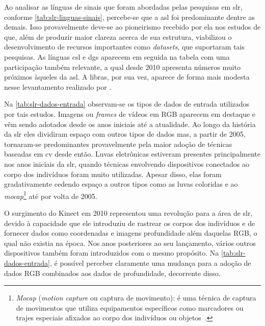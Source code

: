 




Ao analisar as línguas de sinais que foram abordadas pelas pesquisas em \acrshort{slr}, conforme \autoref{tab:slr-linguas-sinais}, percebe-se que a \acrshort{asl} foi predominante dentre as demais. Isso provavelmente deve-se ao pioneirismo recebido por ela nos estudos de  que, além de produzir maior clareza acerca de sua estrutura, viabilizou o desenvolvimento de recursos importantes como \textit{datasets}, que suportaram tais pesquisas.
As línguas \acrfull{csl} e \acrfull{dgs} aparecem em seguida na tabela com uma participação também relevante, a qual desde 2010 apresenta números muito próximos àqueles da \acrshort{asl}. A \acrfull{libras}, por sua vez, aparece de forma mais modesta nesse levantamento realizado por .





Na \autoref{tab:slr-dados-entrada} observam-se os tipos de dados de entrada utilizados por tais estudos. Imagens ou \textit{frames} de vídeos em RGB aparecem em destaque e vêm sendo adotados desde os anos iniciais até a atualidade. Ao longo da história da \acrshort{slr} eles dividiram espaço com outros tipos de dados mas, a partir de 2005, tornaram-se predominantes provavelmente pela maior adoção de técnicas baseadas em \acrlong{cv} desde então.
Luvas eletrônicas estiveram presentes principalmente nos anos iniciais da \acrshort{slr}, quando técnicas envolvendo dispositivos conectados ao corpo dos indivíduos foram muito utilizadas.
Apesar disso, elas foram gradativamente cedendo espaço a outros tipos como as luvas coloridas e ao \textit{mocap}\footnote{
      \textit{Mocap} (\textit{motion capture} ou captura de movimento): é uma técnica de captura de movimentos que utiliza equipamentos específicos como marcadores ou trajes especiais afixados ao corpo dos indivíduos ou objetos~\cite{kitagawa-2017-mocap}.
} até por volta de 2005.

O surgimento do Kinect em 2010 representou uma revolução para a área de \acrshort{slr}, devido à capacidade que ele introduziu de rastrear os corpos dos indivíduos e de fornecer dados como coordenadas e imagens profundidade além daquelas RGB, o qual não  existia na época. Nos anos posteriores ao seu lançamento, vários outros dispositivos também foram introduzidos com o mesmo propósito.
Na \autoref{tab:slr-dados-entrada}, é possível perceber claramente uma mudança para a adoção de dados RGB combinados aos dados de profundidade, decorrente disso.


